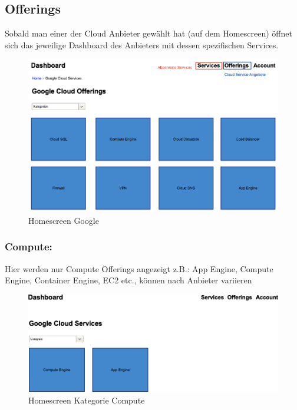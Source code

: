 \subsection{Offerings}
Sobald man einer der Cloud Anbieter gewählt hat (auf dem Homescreen) öffnet 
sich das jeweilige Dashboard des Anbieters mit dessen spezifischen Services.
\begin{figure}[!htbp]
  \includegraphics[width=\textwidth]{./03_Analyse/03_Dashboard/images/homescreen_google}
  \caption{Homescreen Google}
\end{figure}

\newpage

   \subsubsection{Compute:}
Hier werden nur Compute Offerings angezeigt z.B.: App Engine, Compute Engine, 
Container Engine, EC2 etc., können nach Anbieter variieren

\begin{figure}[!htbp]

   \includegraphics[width=\textwidth]{./03_Analyse/03_Dashboard/images/homescreen_google_compute}
   \caption{Homescreen Kategorie Compute}
\end{figure}
 

